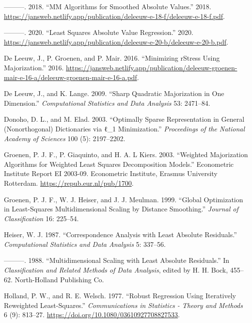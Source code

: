 \documentclass[
  12pt,
  letterpaper,
  DIV=11,
  numbers=noendperiod]{scrartcl}
\newlength{\cslhangindent}
\newenvironment{CSLReferences}[2] %
 {\begin{list}{}{%
  \setlength{\itemindent}{0pt}
  \setlength{\leftmargin}{0pt}
  \setlength{\parsep}{0pt}
  \ifodd #1
   \setlength{\leftmargin}{\cslhangindent}
   \setlength{\itemindent}{-1\cslhangindent}
  \fi
  \setlength{\itemsep}{#2\baselineskip}}}
 {\end{list}}
\theoremstyle{plain}
\theoremstyle{remark}
\begin{document}
\begin{CSLReferences}{1}{0}
---------. 2018. {``{MM Algorithms for Smoothed Absolute Values}.''}
2018.
\url{https://jansweb.netlify.app/publication/deleeuw-e-18-f/deleeuw-e-18-f.pdf}.

---------. 2020. {``{Least Squares Absolute Value Regression}.''} 2020.
\url{https://jansweb.netlify.app/publication/deleeuw-e-20-b/deleeuw-e-20-b.pdf}.

De Leeuw, J., P. Groenen, and P. Mair. 2016. {``{Minimizing rStress
Using Majorization}.''} 2016.
\url{https://jansweb.netlify.app/publication/deleeuw-groenen-mair-e-16-a/deleeuw-groenen-mair-e-16-a.pdf}.

De Leeuw, J., and K. Lange. 2009. {``Sharp Quadratic Majorization in One
Dimension.''} \emph{Computational Statistics and Data Analysis} 53:
2471--84.

Donoho, D. L., and M. Elad. 2003. {``Optimally Sparse Representation in
General (Nonorthogonal) Dictionaries via ℓ\_1 Minimization.''}
\emph{Proceedings of the National Academy of Sciences} 100 (5):
2197--2202.

Groenen, P. J. F., P. Giaquinto, and H. A. L Kiers. 2003. {``{Weighted
Majorization Algorithms for Weighted Least Squares Decomposition
Models}.''} Econometric Institute Report EI 2003-09. Econometric
Institute, Erasmus University Rotterdam.
\url{https://repub.eur.nl/pub/1700}.

Groenen, P. J. F., W. J. Heiser, and J. J. Meulman. 1999. {``{Global
Optimization in Least-Squares Multidimensional Scaling by Distance
Smoothing}.''} \emph{Journal of Classification} 16: 225--54.

Heiser, W. J. 1987. {``{Correspondence Analysis with Least Absolute
Residuals}.''} \emph{Computational Statistics and Data Analysis} 5:
337--56.

---------. 1988. {``{Multidimensional Scaling with Least Absolute
Residuals}.''} In \emph{Classification and Related Methods of Data
Analysis}, edited by H. H. Bock, 455--62. North-Holland Publishing Co.

Holland, P. W., and R. E. Welsch. 1977. {``Robust Regression Using
Iteratively Reweighted Least-Squares.''} \emph{Communications in
Statistics - Theory and Methods} 6 (9): 813--27.
\url{https://doi.org/10.1080/03610927708827533}.


\end{CSLReferences}
\end{document}
